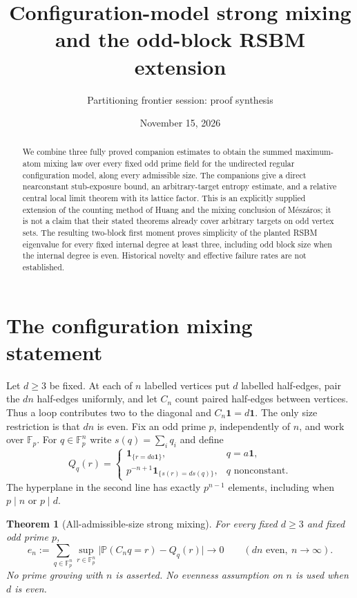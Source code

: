 \documentclass[11pt]{article}
\title{Configuration-model strong mixing and the odd-block RSBM extension}
\author{Partitioning frontier session: proof synthesis}
\date{November 15, 2026}
\newtheorem{theorem}{Theorem}
\newcommand{\Fp}{\mathbb F_p}
\newcommand{\one}{\mathbf1}
\newcommand{\Prob}{\mathbb P}
\begin{document}
\maketitle
\begin{abstract}
We combine three fully proved companion estimates to obtain the
summed maximum-atom mixing law over every fixed odd prime field for the
undirected regular configuration model, along every admissible size.
The companions give a direct nearconstant stub-exposure bound, an
arbitrary-target entropy estimate, and a relative central local limit
theorem with its lattice factor. This is an explicitly supplied
extension of the counting method of Huang and the mixing conclusion
of M\'esz\'aros; it is not a claim that their stated theorems already
cover arbitrary targets on odd vertex sets. The resulting two-block
first moment proves simplicity of the planted RSBM eigenvalue for
every fixed internal degree at least three, including odd block size
when the internal degree is even. Historical novelty and effective
failure rates are not established.
\end{abstract}

\section{The configuration mixing statement}
Let $d\ge3$ be fixed. At each of $n$ labelled vertices put $d$ labelled
half-edges, pair the $dn$ half-edges uniformly, and let $C_n$ count
paired half-edges between vertices. Thus a loop contributes two to
the diagonal and $C_n\one=d\one$. The only size restriction is that
$dn$ is even. Fix an odd prime $p$, independently of $n$, and work
over $\Fp$.
For $q\in\Fp^n$ write $s(q)=\sum_iq_i$ and define
\[
 Q_q(r)=\begin{cases}
  \boldsymbol1_{\{r=da\one\}},&q=a\one,\\
  p^{-n+1}\boldsymbol1_{\{s(r)=ds(q)\}},&q\text{ nonconstant}.
 \end{cases}
\]
The hyperplane in the second line has exactly $p^{n-1}$ elements,
including when $p\mid n$ or $p\mid d$.

\begin{theorem}[All-admissible-size strong mixing]\label{thm:mix}
For every fixed $d\ge3$ and fixed odd prime $p$,
\[
 e_n:=\sum_{q\in\Fp^n}\sup_{r\in\Fp^n}
       \bigl|\Prob(C_nq=r)-Q_q(r)\bigr|\longrightarrow0
 \qquad(dn\text{ even},\ n\to\infty).
\]
No prime growing with $n$ is asserted. No evenness assumption on $n$
is used when $d$ is even.
\end{theorem}
\end{document}

